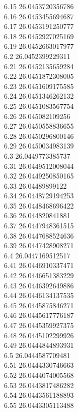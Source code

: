 {6.15	26.0453720356786\\
6.16	26.0453455694687\\
6.17	26.0453191250777\\
6.18	26.0452927025169\\
6.19	26.0452663017977\\
6.2	26.0452399229311\\
6.21	26.0452135659284\\
6.22	26.0451872308005\\
6.23	26.0451609175585\\
6.24	26.0451346262132\\
6.25	26.0451083567754\\
6.26	26.045082109256\\
6.27	26.0450558836655\\
6.28	26.0450296800146\\
6.29	26.0450034983139\\
6.3	26.0449773385737\\
6.31	26.0449512008044\\
6.32	26.0449250850165\\
6.33	26.04489899122\\
6.34	26.0448729194253\\
6.35	26.0448468696422\\
6.36	26.044820841881\\
6.37	26.0447948361515\\
6.38	26.0447688524636\\
6.39	26.0447428908271\\
6.4	26.0447169512517\\
6.41	26.0446910337471\\
6.42	26.0446651383229\\
6.43	26.0446392649886\\
6.44	26.0446134137535\\
6.45	26.0445875846271\\
6.46	26.0445617776187\\
6.47	26.0445359927375\\
6.48	26.0445102299926\\
6.49	26.0444844893931\\
6.5	26.0444587709481\\
6.51	26.0444330746663\\
6.52	26.0444074005568\\
6.53	26.0443817486282\\
6.54	26.0443561188893\\
6.55	26.0443305113488\\
}
